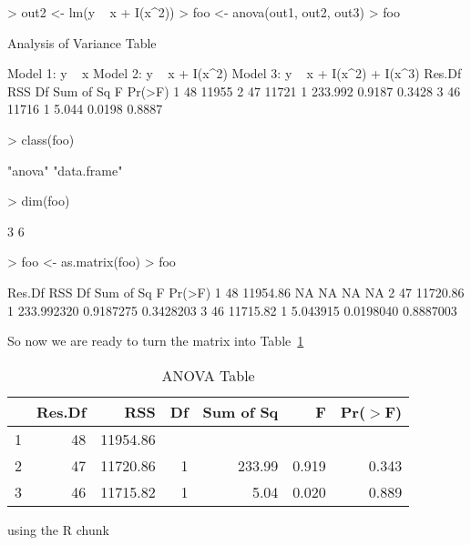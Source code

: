 \documentclass{article}
\begin{document}
\begin{Schunk}
\begin{Sinput}
> out2 <- lm(y ~ x + I(x^2))
> foo <- anova(out1, out2, out3)
> foo
\end{Sinput}
\begin{Soutput}
Analysis of Variance Table

Model 1: y ~ x
Model 2: y ~ x + I(x^2)
Model 3: y ~ x + I(x^2) + I(x^3)
  Res.Df   RSS Df Sum of Sq      F Pr(>F)
1     48 11955                           
2     47 11721  1   233.992 0.9187 0.3428
3     46 11716  1     5.044 0.0198 0.8887
\end{Soutput}
\begin{Sinput}
> class(foo)
\end{Sinput}
\begin{Soutput}
[1] "anova"      "data.frame"
\end{Soutput}
\begin{Sinput}
> dim(foo)
\end{Sinput}
\begin{Soutput}
[1] 3 6
\end{Soutput}
\begin{Sinput}
> foo <- as.matrix(foo)
> foo
\end{Sinput}
\begin{Soutput}
  Res.Df      RSS Df  Sum of Sq         F    Pr(>F)
1     48 11954.86 NA         NA        NA        NA
2     47 11720.86  1 233.992320 0.9187275 0.3428203
3     46 11715.82  1   5.043915 0.0198040 0.8887003
\end{Soutput}
\end{Schunk}

So now we are ready to turn the matrix \verb@foo@
into Table~\ref{tab:one}

\begin{table}[tbp]
\begin{center}
\caption{ANOVA Table}
\label{tab:one}
\begin{tabular}{rrrrrrr}
  \hline
 & Res.Df & RSS & Df & Sum of Sq & F & Pr($>$F) \\ 
  \hline
1 & 48 & 11954.86 &  &  &  &  \\ 
  2 & 47 & 11720.86 & 1 & 233.99 & 0.919 & 0.343 \\ 
  3 & 46 & 11715.82 & 1 & 5.04 & 0.020 & 0.889 \\ 
   \hline
\end{tabular}
\end{center}
\end{table}
using the R chunk
\end{document}
